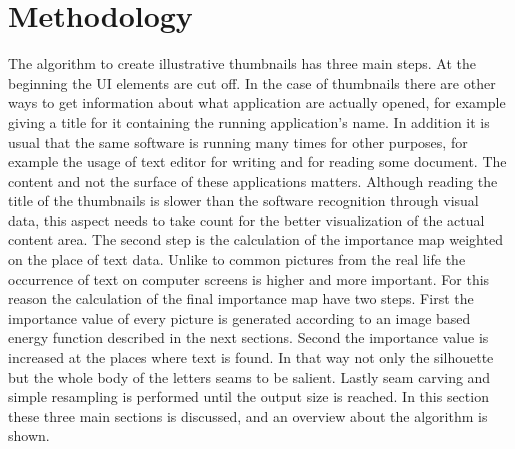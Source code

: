 \documentclass[draft,final]{vutinfth} %
\begin{document}
\chapter{Methodology}
The algorithm to create illustrative thumbnails has three main steps.
At the beginning the UI elements are cut off.
In the case of thumbnails there are other ways to get information about what application are actually opened, for example giving a title for it containing the running application's name.
In addition it is usual that the same software is running many times for other purposes, for example the usage of text editor for writing and for reading some document.
The content and not the surface of these applications matters.
Although reading the title of the thumbnails is slower than the software recognition through visual data, this aspect needs to take count for the better visualization of the actual content area.%
The second step is the calculation of the importance map weighted on the place of text data.
Unlike to common pictures from the real life the occurrence of text on computer screens is higher and more important.
For this reason the calculation of the final importance map have two steps.
First the importance value of every picture is generated according to an image based energy function described in the next sections.
Second the importance value is increased at the places where text is found.
In that way not only the silhouette but the whole body of the letters seams to be salient.
Lastly seam carving and simple resampling is performed  until the output size is reached.
In this section these three main sections is discussed, and an overview about the algorithm is shown.
\end{document}
